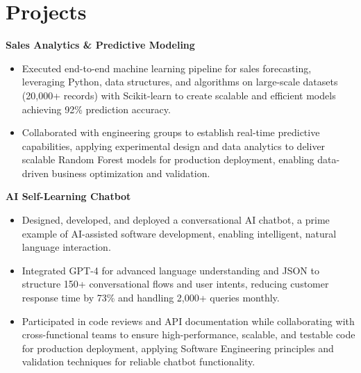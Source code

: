 \documentclass[a4paper,10pt]{article}
\begin{document}
\vspace{-4mm}

\section*{Projects}
\textbf{Sales Analytics \& Predictive Modeling} \\
\begin{itemize}[leftmargin=*, itemsep=0pt, parsep=1pt]
\vspace{-7mm}
    \item Executed end-to-end machine learning pipeline for sales forecasting, leveraging Python, data structures, and algorithms on large-scale datasets (20,000+ records) with Scikit-learn to create scalable and efficient models achieving 92\% prediction accuracy.
    \item Collaborated with engineering groups to establish real-time predictive capabilities, applying experimental design and data analytics to deliver scalable Random Forest models for production deployment, enabling data-driven business optimization and validation.
\end{itemize}

\vspace{-2mm}
\textbf{AI Self-Learning Chatbot} \\
\begin{itemize}[leftmargin=*, itemsep=0pt, parsep=1pt]
\vspace{-7mm}
    \item Designed, developed, and deployed a conversational AI chatbot, a prime example of AI-assisted software development, enabling intelligent, natural language interaction.
    \item Integrated GPT-4 for advanced language understanding and JSON to structure 150+ conversational flows and user intents, reducing customer response time by 73\% and handling 2,000+ queries monthly.
    \item Participated in code reviews and API documentation while collaborating with cross-functional teams to ensure high-performance, scalable, and testable code for production deployment, applying Software Engineering principles and validation techniques for reliable chatbot functionality.
\end{itemize}

\vspace{-2mm}
\end{document}
